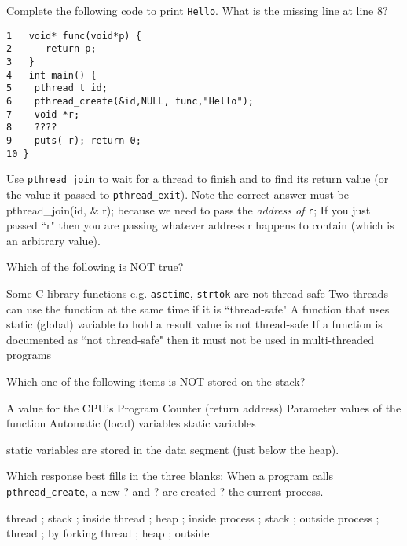 \variant
Complete the following code to print {\tt Hello}. What is the missing line at line $8$?
\begin{verbatim}
1   void* func(void*p) {
2      return p;
3   }
4   int main() {
5    pthread_t id;
6    pthread_create(&id,NULL, func,"Hello");
7    void *r;
8    ????
9    puts( r); return 0;
10 }
\end{verbatim}
\begin{answers}
\end{answers}
\begin{solution}
Use {\tt pthread_join} to wait for a thread to finish and to find its return value (or the value it passed to {\tt pthread_exit}).
Note the correct answer must be  pthread_join(id, \& r);  because we need to pass the {\em address of} {\tt r}; If you just passed ``r" then you are passing whatever address r happens to contain (which is an arbitrary value).
\end{solution}


\variant
Which of the following is NOT true?
\begin{answers}
\answer Some C library functions e.g. {\tt asctime}, {\tt strtok} are not thread-safe
\answer Two threads can use the function at the same time if it is ``thread-safe"
\answer A function that uses static (global) variable to hold a result value is not thread-safe
\correctanswer If a function is documented as ``not thread-safe" then it must not be used in multi-threaded programs
\end{answers}
\begin{solution}
\end{solution}



\variant
Which one of the following items is NOT stored on the stack?
\begin{answers}
\answer  A value for the CPU's Program Counter (return address)
\answer Parameter values of the function
\answer Automatic (local) variables
\correctanswer static variables
\end{answers}
\begin{solution}
static variables are stored in the data segment (just below the heap).
\end{solution}

\variant
Which response best fills in the three blanks: When a program calls {\tt pthread_create}, a new ? and ? are created ? the current process.
\begin{answers}
\correctanswer thread ; stack ; inside
\answer thread ; heap ; inside
\answer process ; stack ; outside
\answer process ; thread ; by forking
\answer thread ; heap ; outside
\end{answers}
\begin{solution}
\end{solution}


